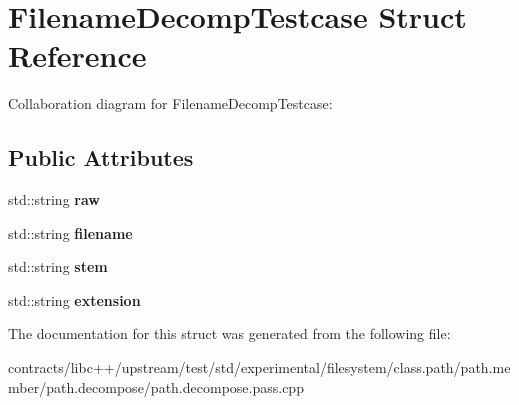 \hypertarget{struct_filename_decomp_testcase}{}\section{Filename\+Decomp\+Testcase Struct Reference}
\label{struct_filename_decomp_testcase}


Collaboration diagram for Filename\+Decomp\+Testcase\+:
\subsection*{Public Attributes}
\begin{DoxyCompactItemize}
\item 
\mbox{\label{struct_filename_decomp_testcase_af142d1e4fbf006bf62cf8fe1cf55fcb9}} 
std\+::string {\bfseries raw}
\item 
\mbox{\label{struct_filename_decomp_testcase_a63ef01a7adfcfc627dbf20f6bf25e6e5}} 
std\+::string {\bfseries filename}
\item 
\mbox{\label{struct_filename_decomp_testcase_a3c2cbd2e70c3e841876935fccc1b9e4c}} 
std\+::string {\bfseries stem}
\item 
\mbox{\label{struct_filename_decomp_testcase_a717b93ab1a5cf3e5f5a2e584ce23ea5b}} 
std\+::string {\bfseries extension}
\end{DoxyCompactItemize}


The documentation for this struct was generated from the following file\+:\begin{DoxyCompactItemize}
\item 
contracts/libc++/upstream/test/std/experimental/filesystem/class.\+path/path.\+member/path.\+decompose/path.\+decompose.\+pass.\+cpp\end{DoxyCompactItemize}
